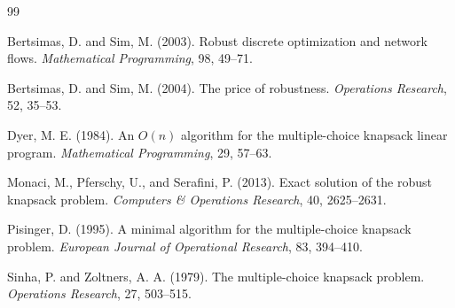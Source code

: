 \documentclass[11pt,a4paper]{article}
\theoremstyle{definition}
\theoremstyle{remark}
\begin{document}
\begin{thebibliography}{99}

Bertsimas, D. and Sim, M. (2003).
\newblock Robust discrete optimization and network flows.
\newblock \emph{Mathematical Programming}, 98, 49--71.

Bertsimas, D. and Sim, M. (2004).
\newblock The price of robustness.
\newblock \emph{Operations Research}, 52, 35--53.

Dyer, M. E. (1984).
\newblock An $O(n)$ algorithm for the multiple-choice knapsack linear program.
\newblock \emph{Mathematical Programming}, 29, 57--63.

Monaci, M., Pferschy, U., and Serafini, P. (2013).
\newblock Exact solution of the robust knapsack problem.
\newblock \emph{Computers \& Operations Research}, 40, 2625--2631.

Pisinger, D. (1995).
\newblock A minimal algorithm for the multiple-choice knapsack problem.
\newblock \emph{European Journal of Operational Research}, 83, 394--410.

Sinha, P. and Zoltners, A. A. (1979).
\newblock The multiple-choice knapsack problem.
\newblock \emph{Operations Research}, 27, 503--515.

\end{thebibliography}
\end{document}
